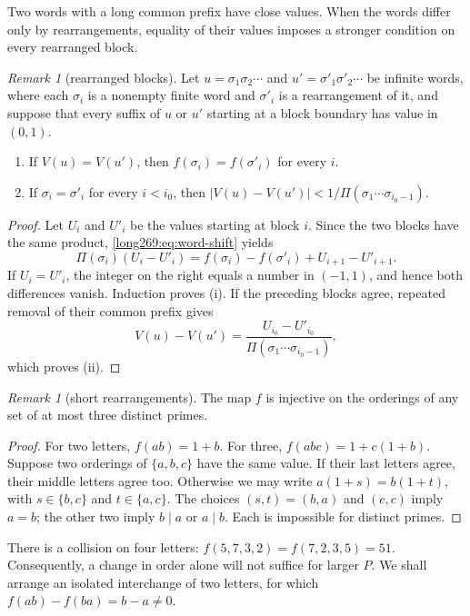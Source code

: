 \documentclass[11pt]{article}
\theoremstyle{remark}
\newtheorem{recordremark}[theorem]{Remark}
\renewenvironment{remark}[1][]{\begin{recordremark}[#1]}{\end{recordremark}}
\theoremstyle{plain}
\begin{document}
Two words with a long common prefix have close values. When the words
differ only by rearrangements, equality of their values imposes a stronger
condition on every rearranged block.

\begin{remark}[rearranged blocks]\label{long269:res:dp-blocks}
Let $u=\sigma_1\sigma_2\cdots$ and $u'=\sigma'_1\sigma'_2\cdots$ be infinite
words, where each $\sigma_i$ is a nonempty finite word and $\sigma'_i$ is a
rearrangement of it, and suppose that every suffix of $u$ or $u'$ starting
at a block boundary has value in $(0,1)$.
\begin{enumerate}[label=\textup{(\roman*)}]
\item If $V(u)=V(u')$, then $f(\sigma_i)=f(\sigma'_i)$ for every $i$.
\item If $\sigma_i=\sigma'_i$ for every $i<i_0$, then
$|V(u)-V(u')|<1/\Pi(\sigma_1\cdots\sigma_{i_0-1})$.
\end{enumerate}
\end{remark}
\begin{proof}
Let $U_i$ and $U'_i$ be the values starting at block $i$. Since the two
blocks have the same product, \eqref{long269:eq:word-shift} yields
\[
 \Pi(\sigma_i)(U_i-U'_i)
 =f(\sigma_i)-f(\sigma'_i)+U_{i+1}-U'_{i+1}.
\]
If $U_i=U'_i$, the integer on the right equals a number in $(-1,1)$,
and hence both differences vanish. Induction proves (i). If the preceding
blocks agree, repeated removal of their common prefix gives
\[
 V(u)-V(u')=\frac{U_{i_0}-U'_{i_0}}
 {\Pi(\sigma_1\cdots\sigma_{i_0-1})},
\]
which proves (ii).
\end{proof}

\begin{remark}[short rearrangements]\label{long269:res:dp-short}
The map $f$ is injective on the orderings of any set of at most three
distinct primes.
\end{remark}
\begin{proof}
For two letters, $f(ab)=1+b$. For three,
$f(abc)=1+c(1+b)$. Suppose two orderings of $\{a,b,c\}$ have the same
value. If their last letters agree, their middle letters agree too.
Otherwise we may write
$a(1+s)=b(1+t)$, with $s\in\{b,c\}$ and $t\in\{a,c\}$.
The choices $(s,t)=(b,a)$ and $(c,c)$ imply $a=b$; the other two imply
$b\mid a$ or $a\mid b$. Each is impossible for distinct primes.
\end{proof}

There is a collision on four letters:
$f(5,7,3,2)=f(7,2,3,5)=51$. Consequently, a change in order alone will not
suffice for larger $P$. We shall arrange an isolated interchange of two
letters, for which $f(ab)-f(ba)=b-a\ne0$.
\end{document}

